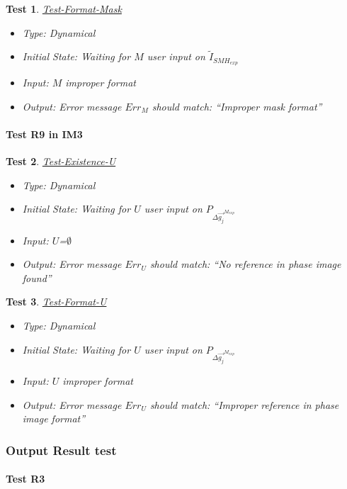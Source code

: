 \documentclass[12pt, titlepage]{article}
\newtheorem{Test}{Test}
\begin{document}
\begin{Test}\normalfont\underline{Test-Format-Mask}
\begin{itemize}
\item Type: Dynamical
\item Initial State: Waiting for $M$ user input on $\widetilde{I}_{SMH_{exp}}$
\item Input: $M$ improper format
\item Output:  Error message $Err_{M}$ should match: \enquote{Improper mask format}
\end{itemize}
\end{Test}

\paragraph{Test R9 in IM3}

\begin{Test}\normalfont\underline{Test-Existence-U}
\begin{itemize}
\item Type: Dynamical
\item Initial State: Waiting for $U$ user input on $P_{\Delta \overrightarrow{g_{j}}^{M_{exp}}}$
\item Input: $U$=$\emptyset$
\item Output:  Error message $Err_{U}$ should match: \enquote{No reference in phase image found}
\end{itemize}
\end{Test}

\begin{Test}\normalfont\underline{Test-Format-U}
\begin{itemize}
\item Type: Dynamical
\item Initial State: Waiting for $U$ user input on $P_{\Delta \overrightarrow{g_{j}}^{M_{exp}}}$
\item Input: $U$ improper format
\item Output:  Error message $Err_{U}$ should match: \enquote{Improper reference in phase image format}
\end{itemize}
\end{Test}

\subsubsection{Output Result test}
	
\paragraph{Test R3}
\end{document}
